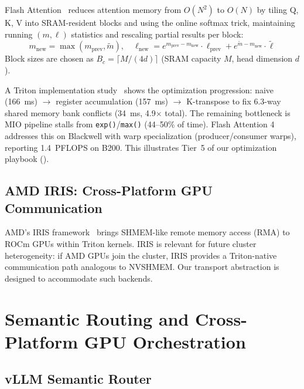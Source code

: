 \documentclass[11pt,letterpaper]{article}
\theoremstyle{definition}
\begin{document}
Flash Attention~\cite{dao2022flashattention} reduces attention memory from $O(N^2)$ to $O(N)$ by tiling Q, K, V into SRAM-resident blocks and using the online softmax trick, maintaining running $(m, \ell)$ statistics and rescaling partial results per block:
\begin{equation}
    m_{\text{new}} = \max(m_{\text{prev}}, \tilde{m}), \quad
    \ell_{\text{new}} = e^{m_{\text{prev}} - m_{\text{new}}} \cdot \ell_{\text{prev}} + e^{\tilde{m} - m_{\text{new}}} \cdot \tilde{\ell}
\end{equation}
Block sizes are chosen as $B_c = \lceil M / (4d) \rceil$ (SRAM capacity $M$, head dimension $d$).

A Triton implementation study~\cite{aminediro-flash-attn} shows the optimization progression: naive (166~ms) $\to$ register accumulation (157~ms) $\to$ K-transpose to fix 6.3-way shared memory bank conflicts (34~ms, 4.9$\times$ total). The remaining bottleneck is MIO pipeline stalls from \texttt{exp()}/\texttt{max()} (44--50\% of time). Flash Attention 4~\cite{flash-attention-4} addresses this on Blackwell with warp specialization (producer/consumer warps), reporting 1.4~PFLOPS on B200. This illustrates Tier~5 of our optimization playbook ().

\subsection{AMD IRIS: Cross-Platform GPU Communication}

AMD's IRIS framework~\cite{amd-iris} brings SHMEM-like remote memory access (RMA) to ROCm GPUs within Triton kernels. IRIS is relevant for future cluster heterogeneity: if AMD GPUs join the cluster, IRIS provides a Triton-native communication path analogous to NVSHMEM. Our transport abstraction is designed to accommodate such backends.

\section{Semantic Routing and Cross-Platform GPU Orchestration}
\label{sec:semantic-routing}

\subsection{vLLM Semantic Router}
\end{document}
